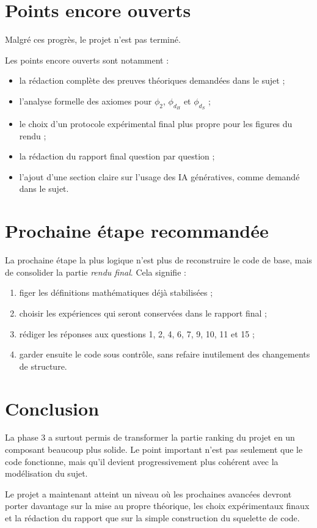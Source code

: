 \documentclass[11pt,a4paper]{article}
\begin{document}
\section{Points encore ouverts}

Malgr\'e ces progr\`es, le projet n'est pas termin\'e.

Les points encore ouverts sont notamment :
\begin{itemize}[leftmargin=*]
    \item la r\'edaction compl\`ete des preuves th\'eoriques demand\'ees dans le sujet ;
    \item l'analyse formelle des axiomes pour \(\phi_2\), \(\phi_{d_H}\) et \(\phi_{d_S}\) ;
    \item le choix d'un protocole exp\'erimental final plus propre pour les figures du rendu ;
    \item la r\'edaction du rapport final question par question ;
    \item l'ajout d'une section claire sur l'usage des IA g\'en\'eratives, comme demand\'e dans le sujet.
\end{itemize}

\section{Prochaine \'etape recommand\'ee}

La prochaine \'etape la plus logique n'est plus de reconstruire le code de base, mais de consolider la partie \emph{rendu final}. Cela signifie :
\begin{enumerate}[leftmargin=*]
    \item figer les d\'efinitions math\'ematiques d\'ej\`a stabilis\'ees ;
    \item choisir les exp\'eriences qui seront conserv\'ees dans le rapport final ;
    \item r\'ediger les r\'eponses aux questions 1, 2, 4, 6, 7, 9, 10, 11 et 15 ;
    \item garder ensuite le code sous contr\^ole, sans refaire inutilement des changements de structure.
\end{enumerate}

\section{Conclusion}

La phase 3 a surtout permis de transformer la partie ranking du projet en un composant beaucoup plus solide. Le point important n'est pas seulement que le code fonctionne, mais qu'il devient progressivement plus coh\'erent avec la mod\'elisation du sujet.

Le projet a maintenant atteint un niveau o\`u les prochaines avanc\'ees devront porter davantage sur la mise au propre th\'eorique, les choix exp\'erimentaux finaux et la r\'edaction du rapport que sur la simple construction du squelette de code.
\end{document}
